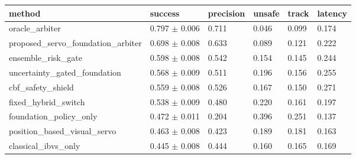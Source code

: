 \begin{tabular}{llllll}
\toprule
method & success & precision & unsafe & track & latency \\
\midrule
oracle\_arbiter & 0.797 $\pm$ 0.006 & 0.711 & 0.046 & 0.099 & 0.174 \\
proposed\_servo\_foundation\_arbiter & 0.698 $\pm$ 0.008 & 0.633 & 0.089 & 0.121 & 0.222 \\
ensemble\_risk\_gate & 0.598 $\pm$ 0.008 & 0.542 & 0.154 & 0.145 & 0.244 \\
uncertainty\_gated\_foundation & 0.568 $\pm$ 0.009 & 0.511 & 0.196 & 0.156 & 0.255 \\
cbf\_safety\_shield & 0.559 $\pm$ 0.008 & 0.526 & 0.167 & 0.150 & 0.271 \\
fixed\_hybrid\_switch & 0.538 $\pm$ 0.009 & 0.480 & 0.220 & 0.161 & 0.197 \\
foundation\_policy\_only & 0.472 $\pm$ 0.011 & 0.204 & 0.396 & 0.251 & 0.137 \\
position\_based\_visual\_servo & 0.463 $\pm$ 0.008 & 0.423 & 0.189 & 0.181 & 0.163 \\
classical\_ibvs\_only & 0.445 $\pm$ 0.008 & 0.444 & 0.160 & 0.165 & 0.169 \\
\bottomrule
\end{tabular}
